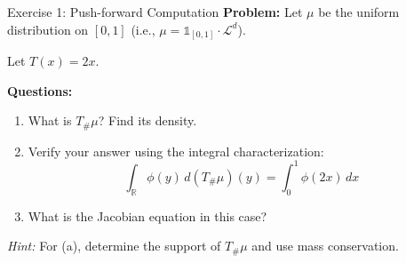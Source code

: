 \documentclass[aspectratio=169]{beamer}
\newcommand{\R}{\mathbb{R}}
\newcommand{\Ld}{\mathcal{L}^d}
\begin{document}
\begin{frame}{Exercise 1: Push-forward Computation}
\textbf{Problem:} Let $\mu$ be the uniform distribution on $[0,1]$ (i.e., $\mu = \mathbb{1}_{[0,1]} \cdot \Ld$).

Let $T(x) = 2x$.

\vspace{0.5cm}
\textbf{Questions:}
\begin{enumerate}
    \item[(a)] What is $T_\# \mu$? Find its density.
    \item[(b)] Verify your answer using the integral characterization:
    \[
    \int_\R \phi(y) \, d(T_\# \mu)(y) = \int_0^1 \phi(2x) \, dx
    \]
    \item[(c)] What is the Jacobian equation in this case?
\end{enumerate}

\vspace{0.3cm}
\textit{Hint:} For (a), determine the support of $T_\# \mu$ and use mass conservation.
\end{frame}
\end{document}
